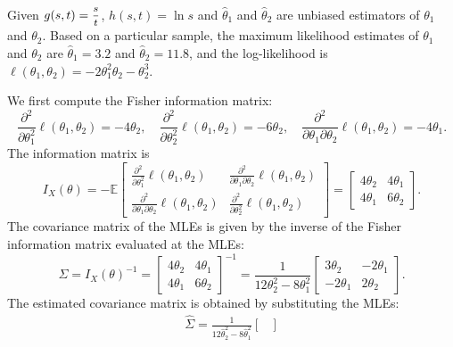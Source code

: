 \begin{example}
    Given $g(s,t) = \mfrac{s}{t}$, $h(s,t) = \ln s$ and 
    $\hat{\theta}_1$ and $\hat{\theta}_2$ are unbiased estimators of $\theta_1$ and $\theta_2$. Based 
    on a particular sample, the maximum likelihood estimates of $\theta_1$ and $\theta_2$ are $\hat{\theta}_1 = 3.2$ and $\hat{\theta}_2 = 11.8$, 
    and the log-likelihood is $\ell(\theta_1, \theta_2) = -2\theta_1^2 \theta_2 - \theta_2^3$.
\end{example}
\begin{solution}
    We first compute the Fisher information matrix:
    \[
        \frac{\partial^2}{\partial \theta_1^2} \ell(\theta_1, \theta_2) = -4\theta_2, \quad
        \frac{\partial^2}{\partial \theta_2^2} \ell(\theta_1, \theta_2) = -6\theta_2, \quad
        \frac{\partial^2}{\partial \theta_1 \partial \theta_2} \ell(\theta_1, \theta_2) = -4\theta_1.
    \]
    The information matrix is 
    \[
        I_X(\theta) = -\mathbb{E} \begin{bmatrix}
            \frac{\partial^2}{\partial \theta_1^2} \ell(\theta_1, \theta_2) & \frac{\partial^2}{\partial \theta_1 \partial \theta_2} \ell(\theta_1, \theta_2) \\
            \frac{\partial^2}{\partial \theta_1 \partial \theta_2} \ell(\theta_1, \theta_2) & \frac{\partial^2}{\partial \theta_2^2} \ell(\theta_1, \theta_2)
        \end{bmatrix} = \begin{bmatrix}
            4\theta_2 & 4\theta_1 \\
            4\theta_1 & 6\theta_2
        \end{bmatrix}.
    \]
    The covariance matrix of the MLEs is given by the inverse of the Fisher information matrix evaluated at the MLEs:
    \[
        \Sigma = I_X(\theta)^{-1} = \begin{bmatrix}
            4\theta_2 & 4 \theta_1 \\
            4\theta_1 & 6 \theta_2
        \end{bmatrix}^{-1} = \frac{1}{12 \theta_2^2 - 8\theta^2_1} \begin{bmatrix}
            3\theta_2 & -2\theta_1 \\
            -2\theta_1 & 2\theta_2
        \end{bmatrix}.
    \]
    The estimated covariance matrix is obtained by substituting the MLEs:
    \begin{align*}
        \hat{\Sigma} 
        = \frac{1}{12 \hat{\theta}_2^2 - 8\hat{\theta}^2_1} \begin{bmatrix}

\end{bmatrix}
\end{align*}
\end{solution}

